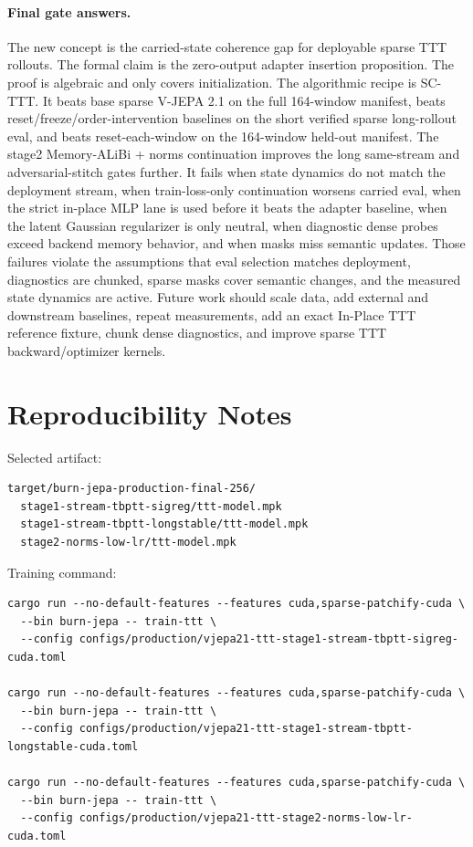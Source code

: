 \documentclass[10pt]{article}
\begin{document}
\paragraph{Final gate answers.}
The new concept is the carried-state coherence gap for deployable sparse TTT
rollouts.  The formal claim is the zero-output adapter insertion proposition.
The proof is algebraic and only covers initialization.  The algorithmic recipe
is SC-TTT.  It beats base sparse V-JEPA 2.1 on the full 164-window manifest,
beats reset/freeze/order-intervention baselines on the short verified sparse
long-rollout eval, and beats reset-each-window on the 164-window held-out
manifest.  The stage2 Memory-ALiBi + norms continuation improves the long
same-stream and adversarial-stitch gates further.  It fails when state dynamics
do not match the deployment stream, when train-loss-only continuation worsens
carried eval, when the strict in-place MLP lane is used before it beats the
adapter baseline, when the latent Gaussian regularizer is only neutral, when
diagnostic dense probes exceed backend memory behavior, and when masks miss
semantic updates.  Those failures violate the assumptions that eval selection
matches deployment, diagnostics are chunked, sparse masks cover semantic
changes, and the measured state dynamics are active.  Future work should scale
data, add external and downstream baselines, repeat measurements, add an exact
In-Place TTT reference fixture, chunk dense diagnostics, and improve sparse TTT
backward/optimizer kernels.

\section{Reproducibility Notes}

Selected artifact:
\begin{verbatim}
target/burn-jepa-production-final-256/
  stage1-stream-tbptt-sigreg/ttt-model.mpk
  stage1-stream-tbptt-longstable/ttt-model.mpk
  stage2-norms-low-lr/ttt-model.mpk
\end{verbatim}

Training command:
\begin{verbatim}
cargo run --no-default-features --features cuda,sparse-patchify-cuda \
  --bin burn-jepa -- train-ttt \
  --config configs/production/vjepa21-ttt-stage1-stream-tbptt-sigreg-cuda.toml

cargo run --no-default-features --features cuda,sparse-patchify-cuda \
  --bin burn-jepa -- train-ttt \
  --config configs/production/vjepa21-ttt-stage1-stream-tbptt-longstable-cuda.toml

cargo run --no-default-features --features cuda,sparse-patchify-cuda \
  --bin burn-jepa -- train-ttt \
  --config configs/production/vjepa21-ttt-stage2-norms-low-lr-cuda.toml
\end{verbatim}
\end{document}
